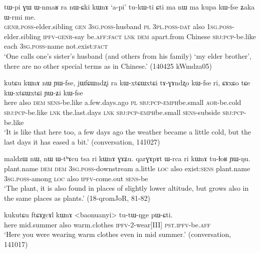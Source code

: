    \begin{exe}
\ex \label{ex:nWCki.kWnA}
\gll  tɯ-pi ɣɯ ɯ-nmaʁ ra nɯ-ɕki kɯnɤ `a-pi' tu-kɯ-ti ɕti ma nɯ ma kupa kɯ-fse ʑaka ɯ-rmi me.\\
\textsc{genr}.\textsc{poss}-elder.sibling \textsc{gen} \textsc{3sg}.\textsc{poss}-husband \textsc{pl} \textsc{3pl}.\textsc{poss}-\textsc{dat} also \textsc{1sg}.\textsc{poss}-elder.sibling \textsc{ipfv}-\textsc{genr}-say be.\textsc{aff}:\textsc{fact} \textsc{lnk} \textsc{dem} apart.from Chinese \textsc{sbj}:\textsc{pcp}-be.like each \textsc{3sg}.\textsc{poss}-name not.exist:\textsc{fact}\\
\glt  `One calls one's sister's husband (and others from his family) `my elder brother', there are no other special terms as in Chinese.' (140425 kWmdza05)
\end{exe}


  \begin{exe}
\ex \label{ex:kutCu.kWnA}
\gll  kutɕu kɯnɤ nɯ ɲɯ-fse, jɯfɕɯndʐi ra kɯ-xtɕɯ\redp{}xtɕi tɤ-ɣɤndʐo kɯ-fse ri, ɕɤxɕo tɕe kɯ-xtɕɯ\redp{}xtɕi ɲɯ-ʑi kɯ-fse \\
here also \textsc{dem} \textsc{sens}-be.like a.few.days.ago \textsc{pl} \textsc{sbj}:\textsc{pcp}-\textsc{emph}\redp{}be.small \textsc{aor}-be.cold \textsc{sbj}:\textsc{pcp}-be.like \textsc{lnk} the.last.days \textsc{lnk} \textsc{sbj}:\textsc{pcp}-\textsc{emph}\redp{}be.small \textsc{sens}-subside \textsc{sbj}:\textsc{pcp}-be.like \\
\glt `It is like that here too, a few days ago the weather became a little cold, but the last days it has eased a bit.' (conversation, 141027)
  \end{exe}
  
    \begin{exe}
\ex \label{ex:ri.kWnA}
\gll   maldzɯ nɯ, nɯ ɯ-tʰɤcu tsa ri kɯnɤ ɣɤʑu. qarɣɤpɤt ɯ-rca ri kɯnɤ tu-ɬoʁ ɲɯ-ŋu. \\
plant.name \textsc{dem} \textsc{dem} \textsc{3sg}.\textsc{poss}-downstream a.little \textsc{loc} also exist:\textsc{sens} plant.name \textsc{3sg}.\textsc{poss}-among \textsc{loc} also \textsc{ipfv}-come.out \textsc{sens}-be \\
\glt `The  plant, it is also found in places of slightly lower altitude, but grows also in the same places as   plants.' (18-qromJoR, 81-82)
    \end{exe}
    
\begin{exe}
\ex \label{ex:ftCAXcAl.kWnA}
\gll   kukutɕu ftɕɤχcɤl kɯnɤ <baonuanyi> tu-tɯ-ŋge pɯ-ɕti. \\
  here mid.summer also warm.clothes \textsc{ipfv}-2-wear[III] \textsc{pst}.\textsc{ipfv}-be.\textsc{aff} \\
  \glt `Here you were wearing warm clothes even in mid summer.' (conversation, 141017)
    \end{exe}
    
